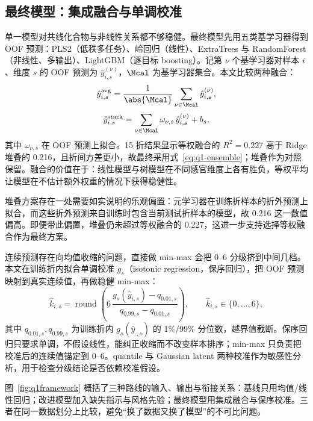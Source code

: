 \subsection{最终模型：集成融合与单调校准}

单一模型对共线化合物与非线性关系都不够稳健。最终模型先用五类基学习器得到 OOF 预测：PLS2（低秩多任务）、岭回归（线性）、ExtraTrees 与 RandomForest（非线性、多输出）、LightGBM（逐目标 boosting）。记第 $\nu$ 个基学习器对样本 $i$、维度 $s$ 的 OOF 预测为 $\hat{y}_{i,s}^{(\nu)}$，$\Mcal$ 为基学习器集合。本文比较两种融合：
\begin{equation}
  \hat{y}_{i,s}^{\mathrm{avg}}=\frac{1}{\abs{\Mcal}}\sum_{\nu\in\Mcal}\hat{y}_{i,s}^{(\nu)},
  \label{eq:q1-ensemble}
\end{equation}
\begin{equation}
  \hat{y}_{i,s}^{\mathrm{stack}}=\sum_{\nu\in\Mcal}\omega_{\nu,s}\,\hat{y}_{i,s}^{(\nu)}+b_s,
  \label{eq:q1-stack}
\end{equation}
其中 $\omega_{\nu,s}$ 在 OOF 预测上拟合。15 折结果显示等权融合的 $R^2=0.227$ 高于 Ridge 堆叠的 0.216，且折间方差更小，故最终采用式~\eqref{eq:q1-ensemble}；堆叠作为对照保留。融合的价值在于：线性模型与树模型在不同感官维度上各有胜负，等权平均让模型在不估计额外权重的情况下获得稳健性。

堆叠方案存在一处需要如实说明的乐观偏置：元学习器在训练折样本的折外预测上拟合，而这些折外预测来自训练时包含当前测试折样本的模型，故 0.216 这一数值偏高。即便带此偏置，堆叠仍未超过等权融合的 0.227，这进一步支持选择等权融合作为最终方案。

连续预测存在向均值收缩的问题，直接做 min-max 会把 0--6 分级挤到中间几档。本文在训练折内拟合单调校准 $g_s$（isotonic regression，保序回归），把 OOF 预测映射到真实连续值，再做稳健 min-max：
\begin{equation}
  \hat{k}_{i,s}=\operatorname{round}\left(
  6\,\frac{g_s(\hat{y}_{i,s})-q_{0.01,s}}{q_{0.99,s}-q_{0.01,s}}
  \right),\qquad \hat{k}_{i,s}\in\{0,\dots,6\},
  \label{eq:q1-grade}
\end{equation}
其中 $q_{0.01,s},q_{0.99,s}$ 为训练折内 $g_s(\hat{y}_{\cdot,s})$ 的 1\%/99\% 分位数，越界值截断。保序回归只要求单调，不假设线性，能纠正收缩而不改变样本排序；min-max 只负责把校准后的连续值锚定到 0--6。quantile 与 Gaussian latent 两种校准作为敏感性分析，用于检查分级结论是否依赖校准假设。


图~\ref{fig:q1framework} 概括了三种路线的输入、输出与衔接关系：基线只用均值/线性回归；改进模型加入缺失指示与风格先验；最终模型用集成融合与保序校准。三者在同一数据划分上比较，避免“换了数据又换了模型”的不可比问题。

